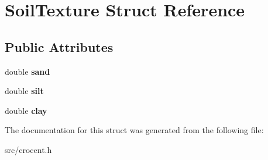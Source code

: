 \hypertarget{struct_soil_texture}{\section{Soil\-Texture Struct Reference}
\label{struct_soil_texture}
}
\subsection*{Public Attributes}
\begin{DoxyCompactItemize}
\item 
\hypertarget{struct_soil_texture_a3c109488746ef1904f66c9c662ca408e}{double {\bfseries sand}}\label{struct_soil_texture_a3c109488746ef1904f66c9c662ca408e}

\item 
\hypertarget{struct_soil_texture_a4535c0888f02e4a0aacbf56732d869f6}{double {\bfseries silt}}\label{struct_soil_texture_a4535c0888f02e4a0aacbf56732d869f6}

\item 
\hypertarget{struct_soil_texture_ac09db8f05f210e0307e4a8da5d6df26c}{double {\bfseries clay}}\label{struct_soil_texture_ac09db8f05f210e0307e4a8da5d6df26c}

\end{DoxyCompactItemize}


The documentation for this struct was generated from the following file\-:\begin{DoxyCompactItemize}
\item 
src/crocent.\-h\end{DoxyCompactItemize}

